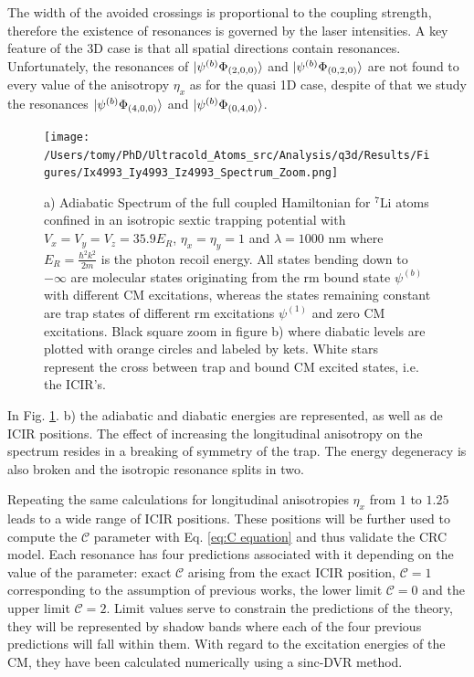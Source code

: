 \documentclass[aps,pre,twocolumn,superscriptaddress,showpacs]{revtex4-1}
\begin{document}
The width of the avoided crossings is proportional to the coupling strength, therefore the existence of resonances is governed by the laser intensities. A key feature of the 3D case is that all spatial directions contain resonances. Unfortunately, the resonances of $\ket{ \psi^{(b)} \Phi_{(2,0,0)}} $ and $\ket{ \psi^{(b)} \Phi_{(0,2,0)}}$ are not found to every value of the anisotropy $\eta_x$ as for the quasi 1D case, despite of that we study the resonances  $\ket{ \psi^{(b)} \Phi_{(4,0,0)}} $ and $\ket{ \psi^{(b)} \Phi_{(0,4,0)}}$.
\begin{figure}[htbp!]
\centering
\texttt{[image: /Users/tomy/PhD/Ultracold\_Atoms\_src/Analysis/q3d/Results/Figures/Ix4993\_Iy4993\_Iz4993\_Spectrum\_Zoom.png]}
\caption{a) Adiabatic Spectrum of the full coupled Hamiltonian for $^7$Li atoms confined in an isotropic sextic trapping potential with $V_x = V_y = V_z = 35.9E_R$, $\eta_x = \eta_y = 1$ and 
$\lambda=1000$ nm where $E_R = \frac{\hbar^2k^2}{2m}$ is the photon recoil energy. All states bending down to $-\infty$ are molecular states originating from the rm bound state $\psi^{(b)}$ 
with different CM excitations, whereas the states remaining constant are trap states of different rm excitations $\psi^{(1)}$ and zero CM excitations. Black square zoom in figure b) where diabatic 
levels are plotted with orange circles and labeled by kets. White stars represent the cross between trap and bound CM excited states, i.e. the ICIR's.}
\label{fig:3D spectrum}
\end{figure}

In Fig. \ref{fig:3D spectrum}. b) the adiabatic and diabatic energies are represented, as well as de ICIR positions. The effect of increasing the longitudinal anisotropy on the spectrum resides in a breaking of symmetry of the trap. The energy degeneracy is also broken and the isotropic resonance splits in two.

Repeating the same calculations for longitudinal anisotropies $\eta_x$ from $1$ to $1.25$  leads to a wide range of ICIR positions.  These positions will be further used to compute the $\mathcal{C}$ parameter with Eq. \eqref{eq:C equation} and thus validate the CRC model. Each resonance has four predictions associated with it depending on the value of the parameter: exact $\mathcal{C}$ arising from the exact ICIR position, $\mathcal{C} = 1$ corresponding to the assumption of previous works, the lower limit $\mathcal{C} = 0$ and the upper limit $\mathcal{C}=2$. Limit values serve to constrain the predictions of the theory, they will be represented by shadow bands where each of the four previous predictions will fall within them. With regard to the excitation energies of the CM, they have been calculated numerically using a sinc-DVR method.
\end{document}
